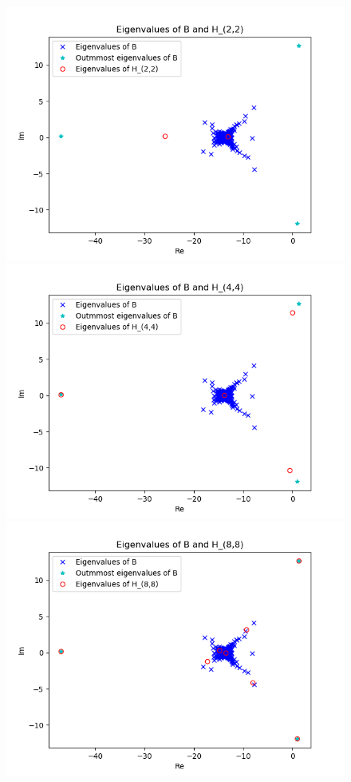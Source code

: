 \begin{figure}[h!]
\centering
\includegraphics[scale=0.4]{../task6/task6c_m2.png}
\includegraphics[scale=0.4]{../task6/task6c_m4.png}
\includegraphics[scale=0.4]{../task6/task6c_m8.png}

\end{figure}
